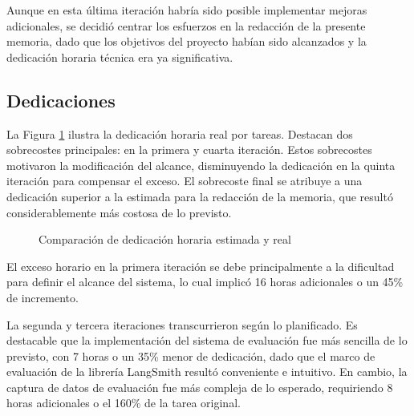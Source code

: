 Aunque en esta última iteración habría sido posible implementar mejoras adicionales, se decidió centrar los esfuerzos en la redacción de la presente memoria, dado que los objetivos del proyecto habían sido alcanzados y la dedicación horaria técnica era ya significativa. 

\subsection{Dedicaciones}
La Figura \ref{fig:horas_real} ilustra la dedicación horaria real por tareas. Destacan dos sobrecostes principales: en la primera y cuarta iteración. Estos sobrecostes motivaron la modificación del alcance, disminuyendo la dedicación en la quinta iteración para compensar el exceso. El sobrecoste final se atribuye a una dedicación superior a la estimada para la redacción de la memoria, que resultó considerablemente más costosa de lo previsto.

\begin{figure}[h]
\centering
{}
\caption{Comparación de dedicación horaria estimada y real}
\label{fig:horas_real}
\end{figure}

El exceso horario en la primera iteración se debe principalmente a la dificultad para definir el alcance del sistema, lo cual implicó 16 horas adicionales o un 45\% de incremento.

La segunda y tercera iteraciones transcurrieron según lo planificado. Es destacable que la implementación del sistema de evaluación fue más sencilla de lo previsto, con 7 horas o un 35\% menor de dedicación, dado que el marco de evaluación de la librería LangSmith resultó conveniente e intuitivo. En cambio, la captura de datos de evaluación fue más compleja de lo esperado, requiriendo 8 horas adicionales o el 160\% de la tarea original.

